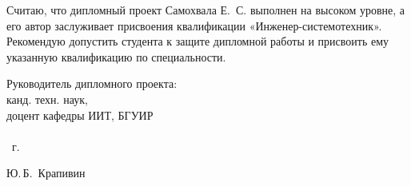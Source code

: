 \documentclass[12pt,a4paper]{article}
\begin{document}
\begin{singlespace}
{Считаю, что дипломный проект Самохвала Е.~С. выполнен на высоком уровне, а его автор заслуживает присвоения квалификации «Инженер-системотехник». Рекомендую допустить студента к защите дипломной работы и присвоить ему указанную квалификацию по специальности.\\
\vfill
  \noindent
  \begin{minipage}{0.54\textwidth}
    \begin{flushleft}
      Руководитель дипломного проекта:\\
      канд. техн. наук,\\ доцент кафедры ИИТ, БГУИР \\
      \\
      \underline{\hspace*{2em}} \underline{\hspace*{6.5em}} \the\year{}~г.
    \end{flushleft}
  \end{minipage}
  \begin{minipage}{0.44\textwidth}
    \begin{flushright}
      \underline{\hspace*{3cm}} Ю.\,Б.~Крапивин
    \end{flushright}
  \end{minipage}
}

\end{singlespace}


\clearpage
\end{document}
